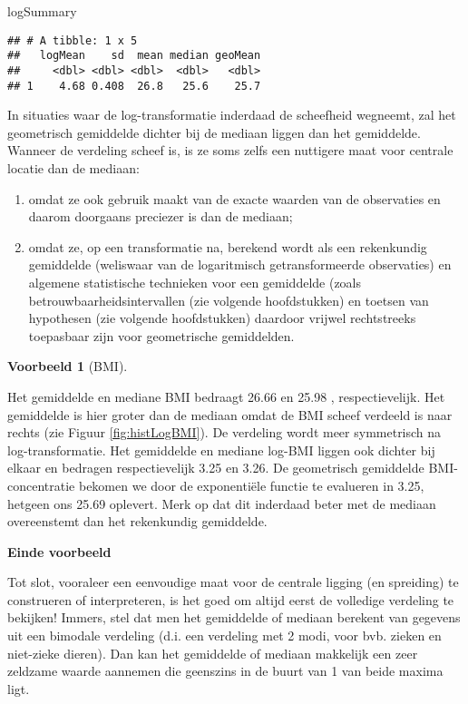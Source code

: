 \documentclass[
  12pt,dutch,coursenotes]{book}
\newenvironment{Shaded}{\begin{snugshade}}{\end{snugshade}}
\newcommand{\NormalTok}[1]{#1}
\theoremstyle{definition}
\theoremstyle{definition}
\newtheorem{example}{Voorbeeld}[chapter]
\theoremstyle{definition}
\theoremstyle{remark}
\begin{document}
\begin{Shaded}
\begin{Highlighting}[]
\NormalTok{logSummary}
\end{Highlighting}
\end{Shaded}

\begin{verbatim}
## # A tibble: 1 x 5
##   logMean    sd  mean median geoMean
##     <dbl> <dbl> <dbl>  <dbl>   <dbl>
## 1    4.68 0.408  26.8   25.6    25.7
\end{verbatim}

In situaties waar de log-transformatie inderdaad de scheefheid wegneemt, zal
het geometrisch gemiddelde dichter bij de mediaan liggen dan het gemiddelde.
Wanneer de verdeling scheef is, is ze soms zelfs een nuttigere maat voor centrale
locatie dan de mediaan:

\begin{enumerate}
\def\labelenumi{\arabic{enumi}.}
\item
  omdat ze ook gebruik maakt van de exacte waarden van de observaties en
  daarom doorgaans preciezer is dan de mediaan;
\item
  omdat ze, op een transformatie na, berekend wordt als een rekenkundig
  gemiddelde (weliswaar van de logaritmisch getransformeerde observaties) en
  algemene statistische technieken voor een gemiddelde (zoals
  betrouwbaarheidsintervallen (zie volgende hoofdstukken) en toetsen van hypothesen (zie volgende hoofdstukken) daardoor vrijwel rechtstreeks
  toepasbaar zijn voor geometrische gemiddelden.
\end{enumerate}

\begin{example}[BMI]
\protect\hypertarget{exm:unnamed-chunk-100}{}{\label{exm:unnamed-chunk-100} \iffalse (BMI) \fi{} }
\end{example}
Het gemiddelde en mediane BMI bedraagt 26.66 en 25.98 , respectievelijk. Het gemiddelde is hier groter dan de mediaan omdat de BMI scheef verdeeld is naar rechts (zie Figuur \ref{fig:histLogBMI}). De verdeling wordt meer symmetrisch na log-transformatie. Het gemiddelde en mediane log-BMI liggen ook dichter bij elkaar en bedragen respectievelijk 3.25 en 3.26. De geometrisch gemiddelde BMI-concentratie bekomen we door de exponentiële functie te evalueren in 3.25, hetgeen ons 25.69 oplevert. Merk op dat dit inderdaad beter met de mediaan overeenstemt dan het rekenkundig gemiddelde.

\textbf{Einde voorbeeld}

Tot slot, vooraleer een eenvoudige maat voor de centrale ligging (en
spreiding) te construeren of interpreteren, is het goed om altijd eerst de
volledige verdeling te bekijken! Immers, stel dat men het gemiddelde of
mediaan berekent van gegevens uit een bimodale verdeling (d.i. een verdeling
met 2 modi, voor bvb. zieken en niet-zieke dieren). Dan kan het gemiddelde of
mediaan makkelijk een zeer zeldzame waarde aannemen die geenszins in de
buurt van 1 van beide maxima ligt.
\end{document}
